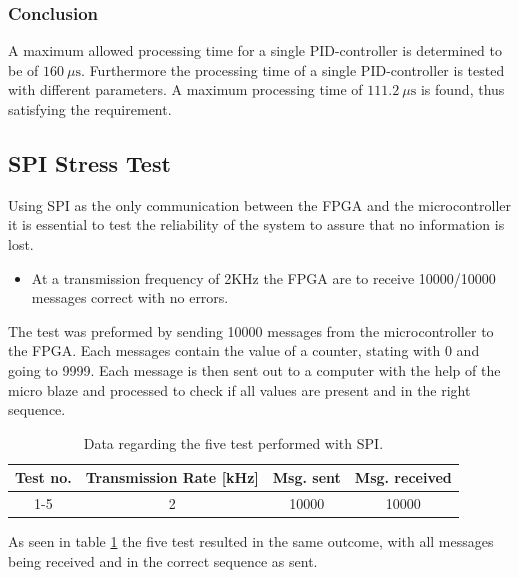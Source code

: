 \documentclass[../../main.tex]{subfiles}
\begin{document}
\subsubsection*{Conclusion}
A maximum allowed processing time for a single PID-controller is determined to be of $\SI{160}{\mu\second}$. Furthermore the processing time of a single PID-controller is tested with different parameters. A maximum processing time of $\SI{111,2}{\mu\second}$ is found, thus satisfying the requirement. 

\subsection{SPI Stress Test}
Using SPI as the only communication between the FPGA and the microcontroller it is essential to test the reliability of the system to assure that no information is lost. 
\begin{itemize}
    \item At a transmission frequency of 2KHz the FPGA are to receive 10000/10000 messages correct with no errors.
\end{itemize}
The test was preformed by sending 10000 messages from the microcontroller to the FPGA. Each messages contain the value of a counter, stating with 0 and going to 9999. Each message is then sent out to a computer with the help of the micro blaze and processed to check if all values are present and in the right sequence.    
\begin{table}[H]
\centering
\begin{tabular}{cccc}
Test no. & Transmission Rate {[}kHz{]} & Msg. sent & Msg. received \\ \hline
1-5 & 2 & 10000 & 10000
\end{tabular}
\caption{Data regarding the five test performed with SPI.}
\label{tab:SPI-stresstest}
\end{table}

As seen in table \ref{tab:SPI-stresstest} the five test resulted in the same outcome, with all messages being received and in the correct sequence as sent. 
\end{document}
